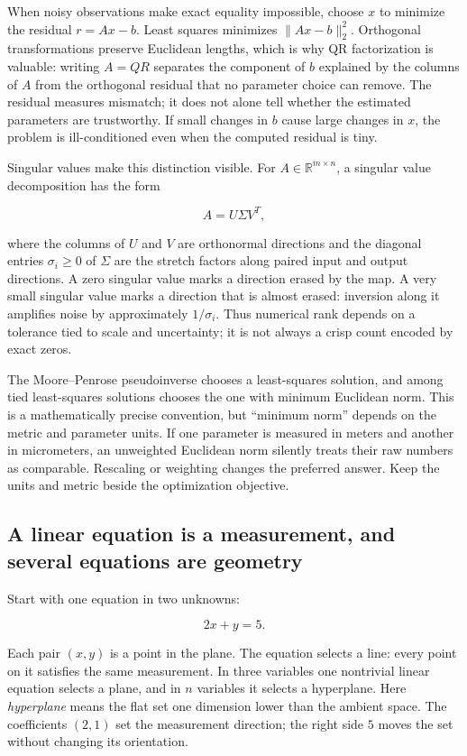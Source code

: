 When noisy observations make exact equality impossible, choose \(x\) to minimize the residual \(r=Ax-b\). Least squares minimizes \(\|Ax-b\|_2^2\). Orthogonal transformations preserve Euclidean lengths, which is why QR factorization is valuable: writing \(A=QR\) separates the component of \(b\) explained by the columns of \(A\) from the orthogonal residual that no parameter choice can remove. The residual measures mismatch; it does not alone tell whether the estimated parameters are trustworthy. If small changes in \(b\) cause large changes in \(x\), the problem is ill-conditioned even when the computed residual is tiny.

Singular values make this distinction visible. For \(A\in\mathbb R^{m\times n}\), a singular value decomposition has the form

\[
A=U\Sigma V^T,
\]

where the columns of \(U\) and \(V\) are orthonormal directions and the diagonal entries \(\sigma_i\ge 0\) of \(\Sigma\) are the stretch factors along paired input and output directions. A zero singular value marks a direction erased by the map. A very small singular value marks a direction that is almost erased: inversion along it amplifies noise by approximately \(1/\sigma_i\). Thus numerical rank depends on a tolerance tied to scale and uncertainty; it is not always a crisp count encoded by exact zeros.

The Moore--Penrose pseudoinverse chooses a least-squares solution, and among tied least-squares solutions chooses the one with minimum Euclidean norm. This is a mathematically precise convention, but ``minimum norm'' depends on the metric and parameter units. If one parameter is measured in meters and another in micrometers, an unweighted Euclidean norm silently treats their raw numbers as comparable. Rescaling or weighting changes the preferred answer. Keep the units and metric beside the optimization objective.

\subsection{A linear equation is a measurement, and several equations are geometry}\label{01-foundations-i-ch019-a-linear-equation-is-a-measurement-and-several-equations-are-geometry}

Start with one equation in two unknowns:

\[
2x+y=5.
\]

Each pair \((x,y)\) is a point in the plane. The equation selects a line: every point on it satisfies the same measurement. In three variables one nontrivial linear equation selects a plane, and in \(n\) variables it selects a hyperplane. Here \emph{hyperplane} means the flat set one dimension lower than the ambient space. The coefficients \((2,1)\) set the measurement direction; the right side \(5\) moves the set without changing its orientation.

